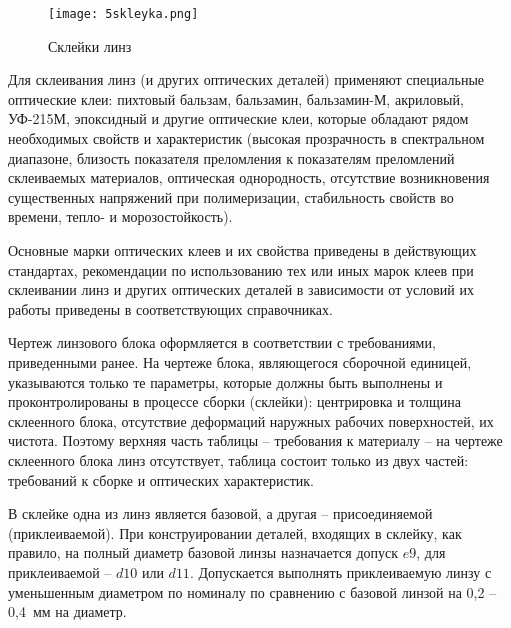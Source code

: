 \begin{figure}[h!]
	\caption{Склейки линз}
	\texttt{[image: 5skleyka.png]}
	\label{pic:5skleyka}
\end{figure}

Для склеивания линз (и других оптических деталей) применяют специальные оптические клеи: пихтовый бальзам, бальзамин, бальзамин-М, акриловый, УФ-215М, эпоксидный и другие оптические клеи, которые обладают рядом необходимых свойств и характеристик (высокая прозрачность в спектральном диапазоне, близость показателя преломления к показателям преломлений склеиваемых материалов, оптическая однородность, отсутствие возникновения существенных напряжений при полимеризации, стабильность свойств во времени, тепло- и морозостойкость).

Основные марки оптических клеев и их свойства приведены в действующих стандартах, рекомендации по использованию тех или иных марок клеев при склеивании линз и других оптических деталей в зависимости от условий их работы приведены в соответствующих справочниках.

Чертеж линзового блока оформляется в соответствии с требованиями, приведенными ранее. На чертеже блока, являющегося сборочной единицей, указываются только те параметры, которые должны быть выполнены и проконтролированы в процессе сборки (склейки): центрировка и толщина склеенного блока, отсутствие деформаций наружных рабочих поверхностей, их чистота. Поэтому верхняя часть таблицы -- требования к материалу -- на чертеже склеенного блока линз отсутствует, таблица состоит только из двух частей: требований к сборке и оптических характеристик.

В склейке одна из линз является базовой, а другая -- присоединяемой (приклеиваемой). При конструировании деталей, входящих в склейку, как правило, на полный диаметр базовой линзы назначается допуск $ e9 $, для приклеиваемой -- $ d10 $ или $ d11 $. Допускается выполнять приклеиваемую линзу с уменьшенным диаметром по номиналу по сравнению с базовой линзой на 0,2 -- 0,4~мм на диаметр.

